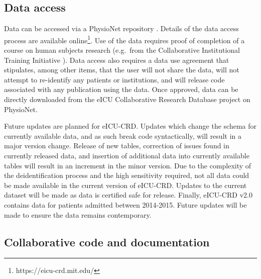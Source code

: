 \documentclass[english]{article}
\begin{document}

\subsection*{Data access}\label{data-access}

Data can be accessed via a PhysioNet repository \cite{physionet-ref}.
Details of the data access process are available online\footnote{https://eicu-crd.mit.edu/}.
Use of the data requires proof of completion of a course on human subjects research (e.g.~from the Collaborative Institutional Training Initiative \cite{citicourse}).
Data access also requires a data use agreement that stipulates, among other items, that the user will not share the data, will not attempt to re-identify any patients or institutions, and will release code associated with any publication using the data. Once approved, data can be directly downloaded from the eICU Collaborative Research Database project on PhysioNet.

Future updates are planned for eICU-CRD. Updates which change the schema for currently available data, and as such break code syntactically, will result in a major version change. Release of new tables, correction of issues found in currently released data, and insertion of additional data into currently available tables will result in an increment in the minor version.
Due to the complexity of the deidentification process and the high sensitivity required, not all data could be made available in the current version of eICU-CRD.
Updates to the current dataset will be made as data is certified safe for release.
Finally, eICU-CRD v2.0 contains data for patients admitted between 2014-2015. Future updates will be made to ensure the data remains contemporary.

\subsection*{Collaborative code and documentation}\label{collaborative-code-and-documentation}
\end{document}
